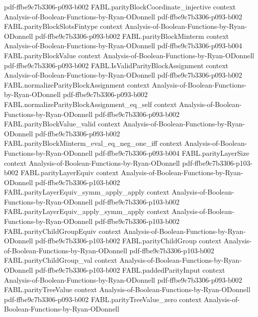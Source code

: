 \begin{theorem}
  {pdf-ffbe9c7b3306-p093-b002}
\proofstep
  {FABL.parityBlockCoordinate_injective}
  {context}
  {Analysis-of-Boolean-Functions-by-Ryan-ODonnell}
  {pdf-ffbe9c7b3306-p093-b002}
\proofstep
  {FABL.parityBlockSlotsFintype}
  {context}
  {Analysis-of-Boolean-Functions-by-Ryan-ODonnell}
  {pdf-ffbe9c7b3306-p093-b002}
\proofstep
  {FABL.parityBlockMinterm}
  {context}
  {Analysis-of-Boolean-Functions-by-Ryan-ODonnell}
  {pdf-ffbe9c7b3306-p093-b004}
\proofstep
  {FABL.parityBlockValue}
  {context}
  {Analysis-of-Boolean-Functions-by-Ryan-ODonnell}
  {pdf-ffbe9c7b3306-p093-b002}
\proofstep
  {FABL.IsValidParityBlockAssignment}
  {context}
  {Analysis-of-Boolean-Functions-by-Ryan-ODonnell}
  {pdf-ffbe9c7b3306-p093-b002}
\proofstep
  {FABL.normalizeParityBlockAssignment}
  {context}
  {Analysis-of-Boolean-Functions-by-Ryan-ODonnell}
  {pdf-ffbe9c7b3306-p093-b002}
\proofstep
  {FABL.normalizeParityBlockAssignment_eq_self}
  {context}
  {Analysis-of-Boolean-Functions-by-Ryan-ODonnell}
  {pdf-ffbe9c7b3306-p093-b002}
\proofstep
  {FABL.parityBlockValue_valid}
  {context}
  {Analysis-of-Boolean-Functions-by-Ryan-ODonnell}
  {pdf-ffbe9c7b3306-p093-b002}
\proofstep
  {FABL.parityBlockMinterm_eval_eq_neg_one_iff}
  {context}
  {Analysis-of-Boolean-Functions-by-Ryan-ODonnell}
  {pdf-ffbe9c7b3306-p093-b004}
\proofstep
  {FABL.parityLayerSize}
  {context}
  {Analysis-of-Boolean-Functions-by-Ryan-ODonnell}
  {pdf-ffbe9c7b3306-p103-b002}
\proofstep
  {FABL.parityLayerEquiv}
  {context}
  {Analysis-of-Boolean-Functions-by-Ryan-ODonnell}
  {pdf-ffbe9c7b3306-p103-b002}
\proofstep
  {FABL.parityLayerEquiv_symm_apply_apply}
  {context}
  {Analysis-of-Boolean-Functions-by-Ryan-ODonnell}
  {pdf-ffbe9c7b3306-p103-b002}
\proofstep
  {FABL.parityLayerEquiv_apply_symm_apply}
  {context}
  {Analysis-of-Boolean-Functions-by-Ryan-ODonnell}
  {pdf-ffbe9c7b3306-p103-b002}
\proofstep
  {FABL.parityChildGroupEquiv}
  {context}
  {Analysis-of-Boolean-Functions-by-Ryan-ODonnell}
  {pdf-ffbe9c7b3306-p103-b002}
\proofstep
  {FABL.parityChildGroup}
  {context}
  {Analysis-of-Boolean-Functions-by-Ryan-ODonnell}
  {pdf-ffbe9c7b3306-p103-b002}
\proofstep
  {FABL.parityChildGroup_val}
  {context}
  {Analysis-of-Boolean-Functions-by-Ryan-ODonnell}
  {pdf-ffbe9c7b3306-p103-b002}
\proofstep
  {FABL.paddedParityInput}
  {context}
  {Analysis-of-Boolean-Functions-by-Ryan-ODonnell}
  {pdf-ffbe9c7b3306-p093-b002}
\proofstep
  {FABL.parityTreeValue}
  {context}
  {Analysis-of-Boolean-Functions-by-Ryan-ODonnell}
  {pdf-ffbe9c7b3306-p093-b002}
\proofstep
  {FABL.parityTreeValue_zero}
  {context}
  {Analysis-of-Boolean-Functions-by-Ryan-ODonnell}

\end{theorem}
